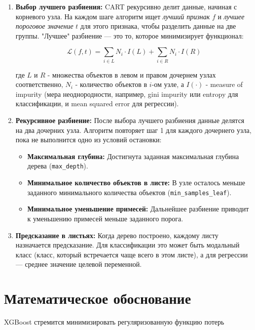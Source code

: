 \begin{enumerate}
    \item \textbf{Выбор лучшего разбиения:} CART рекурсивно делит данные, начиная с корневого узла. На каждом шаге алгоритм ищет \textit{лучший признак} $f$ и \textit{лучшее пороговое значение} $t$ для этого признака, чтобы разделить данные на две группы.  "Лучшее" разбиение — это то, которое минимизирует функционал:

          \[
              \mathcal{L}(f, t) = \sum_{i \in L} N_i \cdot I(L) + \sum_{i \in R} N_i \cdot I(R)
          \]

          где $L$ и $R$ - множества объектов в левом и правом дочернем узлах соответственно, $N_i$ - количество объектов в $i$-ом узле, а $I( \cdot )$ - measure of impurity (мера неоднородности, например, gini impurity или entropy для классификации, и mean squared error для регрессии).


    \item \textbf{Рекурсивное разбиение:}  После выбора лучшего разбиения данные делятся на два дочерних узла.  Алгоритм повторяет шаг 1 для каждого дочернего узла, пока не выполнится одно из условий остановки:

          \begin{itemize}
              \item \textbf{Максимальная глубина:} Достигнута заданная максимальная глубина дерева (\texttt{max\_depth}).
              \item \textbf{Минимальное количество объектов в листе:} В узле осталось меньше заданного минимального количества объектов (\texttt{min\_samples\_leaf}).
              \item \textbf{Минимальное уменьшение примесей:}  Дальнейшее разбиение приводит к уменьшению примесей меньше заданного порога.
          \end{itemize}

    \item \textbf{Предсказание в листьях:}  Когда дерево построено, каждому листу назначается предсказание.  Для классификации это может быть модальный класс (класс, который встречается чаще всего в этом листе), а для регрессии — среднее значение целевой переменной.
\end{enumerate}

\section{Математическое обоснование}
XGBoost стремится минимизировать регуляризованную функцию потерь

